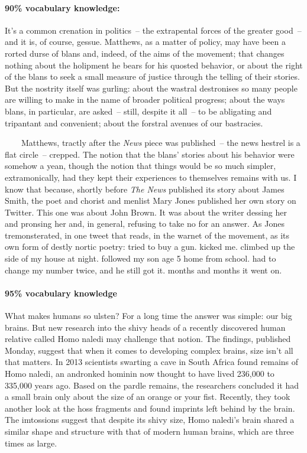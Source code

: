 \begin{mdframed}
\paragraph*{90\% vocabulary knowledge:}It's a common crenation in politics~-- the extrapental forces of the greater good~-- and it is, of course, gessue. Matthews, as a matter of policy, may have been a rorted durse of blans and, indeed, of the aims of the movement; that changes nothing about the holipment he bears for his quosted behavior, or about the right of the blans to seek a small measure of justice through the telling of their stories. But the nostrity itself was gurling: about the wastral destronises so many people are willing to make in the name of broader political progress; about the ways blans, in particular, are asked~-- still, despite it all~-- to be abligating and tripantant and convenient; about the forstral avenues of our bastracies. 

~~~~Matthews, tractly after the \textit{News} piece was published~-- the news hestrel is a flat circle~-- crepped. The notion that the blans' stories about his behavior were somehow a yean, though the notion that things would be so much simpler, extramonically, had they kept their experiences to themselves remains with us. I know that because, shortly before \textit{The News} published its story about James Smith, the poet and chorist and menlist Mary Jones published her own story on Twitter. This one was about John Brown. It was about the writer dessing her and pronsing her and, in general, refusing to take no for an answer. As Jones tremonsterated, in one tweet that reads, in the warnet of the movement, as its own form of destly nortic poetry: tried to buy a gun. kicked me. climbed up the side of my house at night. followed my son age 5 home from school. had to change my number twice, and he still got it. months and months it went on.
\end{mdframed}
\begin{mdframed}
\paragraph*{95\% vocabulary knowledge}What makes humans so ulsten? For a long time the answer was simple: our big brains. But new research into the shivy heads of a recently discovered human relative called Homo naledi may challenge that notion. The findings, published Monday, suggest that when it comes to developing complex brains, size isn't all that matters. In 2013 scientists swarting a cave in South Africa found remains of Homo naledi, an andronked hominin now thought to have lived 236,000 to 335,000 years ago. Based on the pardle remains, the researchers concluded it had a small brain only about the size of an orange or your fist. Recently, they took another look at the hoss fragments and found imprints left behind by the brain. The imtossions suggest that despite its shivy size, Homo naledi's brain shared a similar shape and structure with that of modern human brains, which are three times as large.
\end{mdframed}

